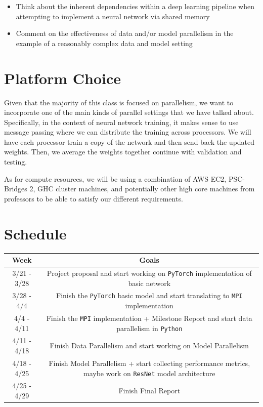 \documentclass{article}
\begin{document}
\begin{itemize}
  \item Think about the inherent dependencies within a deep learning pipeline when attempting to implement a neural network via shared memory
  \item Comment on the effectiveness of data and/or model parallelism in the example of a reasonably complex data and model setting
\end{itemize}

\section*{Platform Choice} Given that the majority of this class is focused on parallelism, we want to incorporate one of the main kinds of parallel settings that we have talked about. Specifically, in the context of neural network training, it makes sense to use message passing where we can distribute the training across processors. We will have each processor train a copy of the network and then send back the updated weights. Then, we average the weights together continue with validation and testing.

As for compute resources, we will be using a combination of AWS EC2, PSC-Bridges 2, GHC cluster machines, and potentially other high core machines from professors to be able to satisfy our different requirements.

\section*{Schedule}

\begin{center}
	\begin{tabular}{ |c|c| }
		\hline
		Week & Goals \\
		\hline
		3/21 - 3/28 & Project proposal and start working on \texttt{PyTorch} implementation of basic network \\
		\hline
		3/28 - 4/4 & Finish the \texttt{PyTorch} basic model and start translating to \texttt{MPI} implementation\\
		\hline
		4/4 - 4/11 & Finish the \texttt{MPI} implementation + Milestone Report and start data parallelism in \texttt{Python} \\
		\hline
		4/11 - 4/18 & Finish Data Parallelism and start working on Model Parallelism\\
		\hline
		4/18 - 4/25 & Finish Model Parallelism + start collecting performance metrics, maybe work on \texttt{ResNet} model architecture\\
		\hline
		4/25 - 4/29 & Finish Final Report\\
		\hline
	\end{tabular}\\
\end{center}
\end{document}

